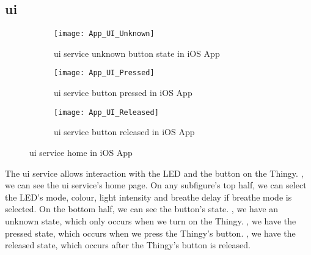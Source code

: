 \subsection{\gls{ui}}
\begin{figure}[hbt!]
	\centering
	\begin{subfigure}{.31\textwidth}
		\centering
		\texttt{[image: App\_UI\_Unknown]}
		\caption{\gls{ui} service unknown button state in iOS App}
		\label{fig:app_ui_unknown}
	\end{subfigure}
	\begin{subfigure}{.31\textwidth}
		\centering
		\texttt{[image: App\_UI\_Pressed]}
		\caption{\gls{ui} service button pressed in iOS App}
		\label{fig:app_ui_pressed}
	\end{subfigure}
	\begin{subfigure}{.31\textwidth}
		\centering
		\texttt{[image: App\_UI\_Released]}
		\caption{\gls{ui} service button released in iOS App}
		\label{fig:app_ui_released}
	\end{subfigure}
	\caption{\gls{ui} service home in iOS App}
	\label{fig:app_ui}
\end{figure}
The \gls{ui} service allows interaction with the LED and the button on the Thingy. , we can see the \gls{ui} service's home page. On any subfigure's top half, we can select the LED's mode, colour, light intensity and breathe delay if breathe mode is selected. On the bottom half, we can see the button's state. , we have an unknown state, which only occurs when we turn on the Thingy. , we have the pressed state, which occurs when we press the Thingy's button. , we have the released state, which occurs after the Thingy's button is released.

